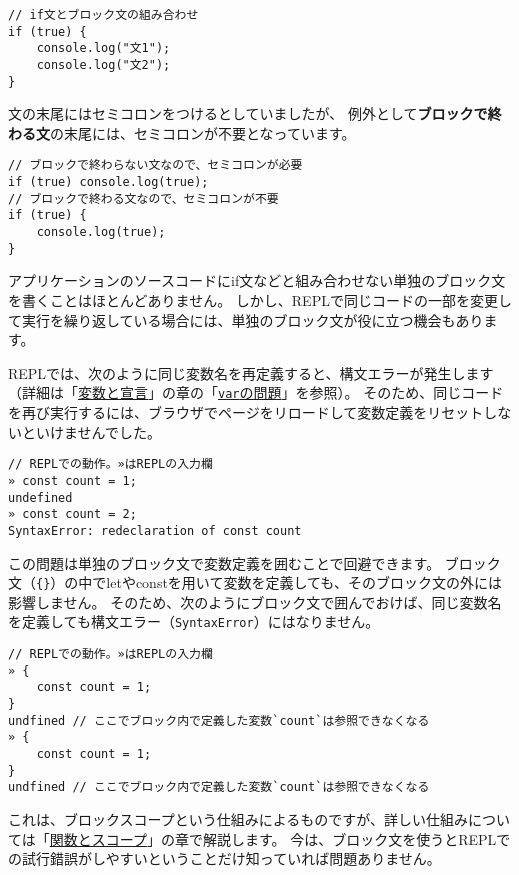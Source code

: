 \begin{lstlisting}
// if文とブロック文の組み合わせ
if (true) {
    console.log("文1");
    console.log("文2");
}
\end{lstlisting}

文の末尾にはセミコロンをつけるとしていましたが、
例外として\textbf{ブロックで終わる文}の末尾には、セミコロンが不要となっています。

\begin{lstlisting}
// ブロックで終わらない文なので、セミコロンが必要
if (true) console.log(true);
// ブロックで終わる文なので、セミコロンが不要
if (true) {
    console.log(true);
}
\end{lstlisting}

\begin{tcolorbox}[title=単独のブロック文の活用]\label{isolate-block-statement}

アプリケーションのソースコードにif文などと組み合わせない単独のブロック文を書くことはほとんどありません。
しかし、REPLで同じコードの一部を変更して実行を繰り返している場合には、単独のブロック文が役に立つ機会もあります。

REPLでは、次のように同じ変数名を再定義すると、構文エラーが発生します（詳細は「\href{../variables/README.md}{変数と宣言}」の章の「\href{../variables/README.md\#var-issues}{\texttt{var}の問題}」を参照）。
そのため、同じコードを再び実行するには、ブラウザでページをリロードして変数定義をリセットしないといけませんでした。

\begin{lstlisting}
// REPLでの動作。»はREPLの入力欄
» const count = 1;
undefined
» const count = 2;
SyntaxError: redeclaration of const count
\end{lstlisting}

この問題は単独のブロック文で変数定義を囲むことで回避できます。
ブロック文（\texttt{\{\}}）の中でletやconstを用いて変数を定義しても、そのブロック文の外には影響しません。
そのため、次のようにブロック文で囲んでおけば、同じ変数名を定義しても構文エラー（\texttt{SyntaxError}）にはなりません。

\begin{lstlisting}
// REPLでの動作。»はREPLの入力欄
» {
    const count = 1;
}
undfined // ここでブロック内で定義した変数`count`は参照できなくなる
» {
    const count = 1;
}
undfined // ここでブロック内で定義した変数`count`は参照できなくなる
\end{lstlisting}

これは、ブロックスコープという仕組みによるものですが、詳しい仕組みについては「\href{../function-scope/README.md}{関数とスコープ}」の章で解説します。
今は、ブロック文を使うとREPLでの試行錯誤がしやすいということだけ知っていれば問題ありません。
\end{tcolorbox}

